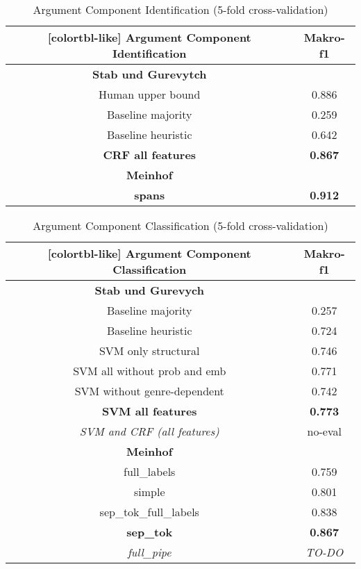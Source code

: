 \documentclass[12]{article}
\newcommand\T{\rule{0pt}{3.5ex}}       %
\newcommand\I{\rule[-1.25ex]{0pt}{0pt}} %
\newcommand\B{\rule[-2.0ex]{0pt}{0pt}} %
\theoremstyle{mytheoremstyle}
\theoremstyle{mytheoremstyle}
\theoremstyle{myproblemstyle}
\begin{document}
  \begin{table}[!h]
    \centering
    \begin{NiceTabular}{c|c}[colortbl-like]
      \large\textbf{Argument Component Identification} &  \large\textbf{Makro-f1}\\ 
      \hline
      \hline
      \textbf{Stab und Gurevytch}& \T \I \\
      Human upper bound & 0.886\\
      Baseline majority & 0.259\\
      Baseline heuristic & 0.642\\
      \textbf{CRF all features} & \textbf{0.867}\B\\
      \hline
      \textbf{Meinhof} & \T \I \\
      \textbf{spans} & \textbf{0.912}\\ 
    \end{NiceTabular}
    \caption{Argument Component Identification (5-fold cross-validation)}
    \label{tab:my_label}
  \end{table}

  \begin{table}[!h]
    \centering
    \begin{NiceTabular}{c|c}[colortbl-like]
      \large\textbf{Argument Component Classification} &  \large\textbf{Makro-f1}\\
      \hline
      \hline
      \textbf{Stab und Gurevych} & \T \I \\
      Baseline majority & 0.257\\
      Baseline heuristic & 0.724\\
      SVM only structural & 0.746\\
      SVM all without prob and emb & 0.771\\
      SVM without genre-dependent & 0.742\\
      \textbf{SVM all features} & \textbf{0.773}\\
      \textit{SVM and CRF (all features)} & no-eval \B \\
      \hline
      \textbf{Meinhof} & \T \I \\
      full\_labels & 0.759\\
      simple & 0.801\\
      sep\_tok\_full\_labels & 0.838\\
      \textbf{sep\_tok} & \textbf{0.867}\\
      \textit{full\_pipe} & \textit{TO-DO}\\

    \end{NiceTabular}
    \caption{Argument Component Classification (5-fold cross-validation)}
    \label{tab:my_label}
  \end{table}
\end{document}

